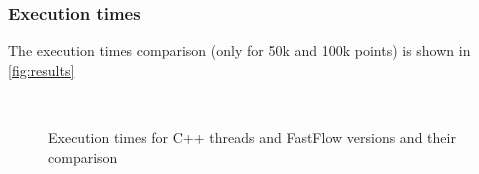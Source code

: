 \subsubsection{Execution times}
The execution times comparison (only for 50k and 100k points) is shown in \autoref{fig:results}
\begin{figure}[H]
    \centering
    \\
    \caption{Execution times for C++ threads and FastFlow versions and their comparison}
    \label{fig:results}
\end{figure}

